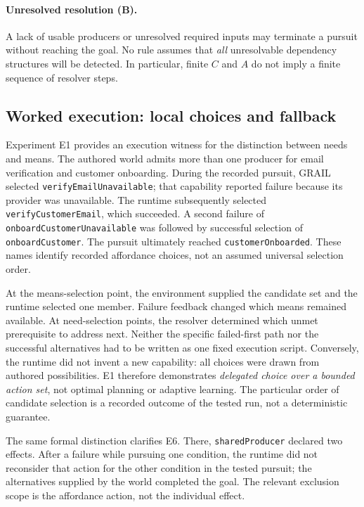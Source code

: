 \documentclass[11pt]{article}
\begin{document}
\paragraph{Unresolved resolution (B).} A lack of usable producers or unresolved required inputs may terminate a pursuit without reaching the goal. No rule assumes that \emph{all} unresolvable dependency structures will be detected. In particular, finite $C$ and $A$ do not imply a finite sequence of resolver steps.

\subsection{Worked execution: local choices and fallback}
Experiment E1 provides an execution witness for the distinction between needs and means. The authored world admits more than one producer for email verification and customer onboarding. During the recorded pursuit, GRAIL selected \texttt{verifyEmailUnavailable}; that capability reported failure because its provider was unavailable. The runtime subsequently selected \texttt{verifyCustomerEmail}, which succeeded. A second failure of \texttt{onboardCustomerUnavailable} was followed by successful selection of \texttt{onboardCustomer}. The pursuit ultimately reached \texttt{customerOnboarded}. These names identify recorded affordance choices, not an assumed universal selection order.

At the means-selection point, the environment supplied the candidate set and the runtime selected one member. Failure feedback changed which means remained available. At need-selection points, the resolver determined which unmet prerequisite to address next. Neither the specific failed-first path nor the successful alternatives had to be written as one fixed execution script. Conversely, the runtime did not invent a new capability: all choices were drawn from authored possibilities. E1 therefore demonstrates \emph{delegated choice over a bounded action set}, not optimal planning or adaptive learning. The particular order of candidate selection is a recorded outcome of the tested run, not a deterministic guarantee.

The same formal distinction clarifies E6. There, \texttt{sharedProducer} declared two effects. After a failure while pursuing one condition, the runtime did not reconsider that action for the other condition in the tested pursuit; the alternatives supplied by the world completed the goal. The relevant exclusion scope is the affordance action, not the individual effect.
\end{document}
